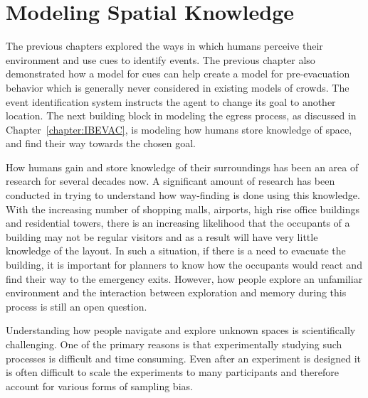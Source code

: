 
\chapter{Modeling Spatial Knowledge}
\label{chapter:SpatialKnowledgeChapter}

The previous chapters explored the ways in which humans perceive their environment and use cues to identify events. The previous chapter also demonstrated how a model for cues can help create a model for pre-evacuation behavior which is generally never considered in existing models of crowds. The event identification system instructs the agent to change its goal to another location. The next building block in modeling the egress process, as discussed in Chapter~\ref{chapter:IBEVAC}, is modeling how humans store knowledge of space, and find their way towards the chosen goal.

How humans gain and store knowledge of their surroundings has been an area of research for several decades now. A significant amount of research has been conducted in trying to understand how way-finding is done using this knowledge. With the increasing number of shopping malls, airports, high rise office buildings and residential towers, there is an increasing likelihood that the occupants of a building may not be regular visitors and as a result will have very little knowledge of the layout. In such a situation, if there is a need to evacuate the building, it is important for planners to know how the occupants would react and find their way to the emergency exits. However, how people explore an unfamiliar environment and the interaction between exploration and memory during this process is still an open question.

Understanding how people navigate and explore unknown spaces is scientifically challenging. One of the primary reasons is that experimentally studying such processes  is difficult and time consuming. Even after an experiment is designed it is often difficult to scale the experiments to many participants and therefore account for various forms of sampling bias.

